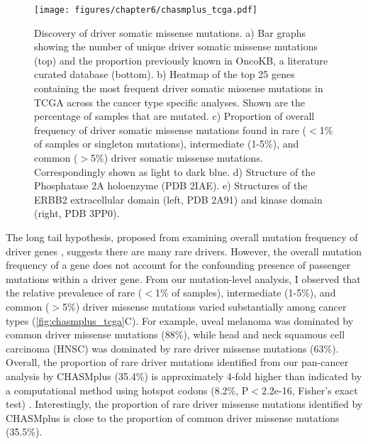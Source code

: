 \begin{figure}
  \centering
  \makeatletter
  \let\@currsize\normalsize
  \texttt{[image: figures/chapter6/chasmplus\_tcga.pdf]}
  \caption[Cancer driver prediction benchmark.]{Discovery of driver somatic missense mutations. a) Bar graphs showing the number of unique driver somatic missense mutations (top) and the proportion previously known in OncoKB, a literature curated database (bottom). b) Heatmap of the top 25 genes containing the most frequent driver somatic missense mutations in TCGA across the cancer type specific analyses. Shown are the percentage of samples that are mutated. c) Proportion of overall frequency of driver somatic missense mutations found in rare ($<$1\% of samples or singleton mutations), intermediate (1-5\%), and common ($>$5\%) driver somatic missense mutations. Correspondingly shown as light to dark blue. d) Structure of the Phosphatase 2A holoenzyme (PDB 2IAE). e) Structures of the ERBB2 extracellular domain (left, PDB 2A91) and kinase domain (right, PDB 3PP0).}
  \label{fig:chasmplus_tcga}
\end{figure}

The long tail hypothesis, proposed from examining overall mutation frequency of driver genes \cite{RN27, RN35}, suggests there are many rare drivers. However, the overall mutation frequency of a gene does not account for the confounding presence of passenger mutations within a driver gene. From our mutation-level analysis, I observed that the relative prevalence of rare ($<$1\% of samples), intermediate (1-5\%), and common ($>$5\%) driver missense mutations varied substantially among cancer types (\autoref{fig:chasmplus_tcga}C). For example, uveal melanoma was dominated by common driver missense mutations (88\%), while head and neck squamous cell carcinoma (HNSC) was dominated by rare driver missense mutations (63\%). Overall, the proportion of rare driver mutations identified from our pan-cancer analysis by CHASMplus (35.4\%) is approximately 4-fold higher than indicated by a computational method using hotspot codons (8.2\%, P$<$2.2e-16, Fisher's exact test) \cite{RN23}.   Interestingly, the proportion of rare driver missense mutations identified by CHASMplus is close to the proportion of common driver missense mutations (35.5\%).  

